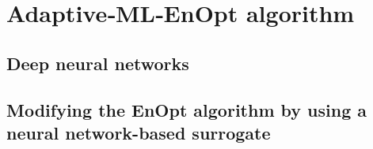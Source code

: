 \chapter{Adaptive‑ML‑EnOpt algorithm}

\section{Deep neural networks}

\section{Modifying the EnOpt algorithm by using a neural network-based surrogate}